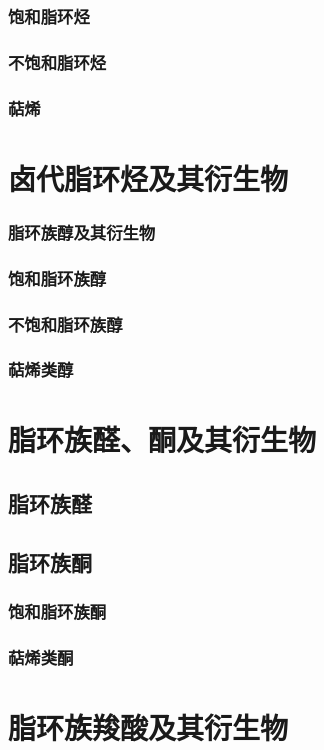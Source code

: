 \documentclass[UTF8]{../03-Chemistry}
\begin{document}
    \subsubsection{饱和脂环烃}
    \subsubsection{不饱和脂环烃}
    \subsubsection{萜烯}
\section{卤代脂环烃及其衍生物}
    \subsubsection{脂环族醇及其衍生物}
    \subsubsection{饱和脂环族醇}
    \subsubsection{不饱和脂环族醇}
    \subsubsection{萜烯类醇}
\section{脂环族醛、酮及其衍生物}
    \subsection{脂环族醛}
    \subsection{脂环族酮}
        \subsubsection{饱和脂环族酮}
        \subsubsection{萜烯类酮}
\section{脂环族羧酸及其衍生物}
\end{document}
